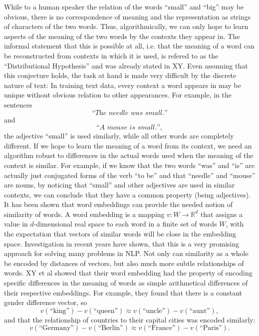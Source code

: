 \documentclass{amsart}
\theoremstyle{plain}
\theoremstyle{definition}
\newcommand{\R}{\mathbb{R}}
\begin{document}
While to a human speaker the relation of the words ``small'' and ``big'' may be obvious, there is no correspondence of meaning and the representation as strings of characters of the two words.
Thus, algorithmically, we can only hope to learn aspects of the meaning of the two words by the contexts they appear in.
The informal statement that this is possible at all, i.e. that the meaning of a word can be reconstructed from contexts in which it is used, is refered to as the ``Distributional Hypothesis'' and was already stated in XY.
Even assuming that this conjecture holds, the task at hand is made very difficult by the discrete nature of text:
In training text data, every context a word appears in may be unique without obvious relation to other appearances.
For example, in the sentences
\begin{equation*}
  \textit{``The needle was small.''}
\end{equation*}
and
\begin{equation*}
  \textit{``A mouse is small.''},
\end{equation*}
the adjective ``small'' is used similarly, while all other words are completely different.
If we hope to learn the meaning of a word from its context, we need an algorithm robust to differences in the actual words used when the meaning of the context is similar.
For example, if we know that the two words ``was'' and ``is'' are actually just conjugated forms of the verb ``to be'' and that ``needle'' and ``mouse'' are nouns, by noticing that ``small'' and other adjectives are used in similar contexts, we can conclude that they have a common property (being adjectives).
It has been shown that word embeddings can provide the needed notion of similarity of words.
A word embedding is a mapping $v : W \rightarrow \R^d$ that assigns a value in $d$-dimensional real space to each word in a finite set of words $W$, with the expectation that vectors of similar words will be close in the embedding space.
Investigation in recent years have shown, that this is a very promising approach for solving many problems in NLP.
Not only can similarity as a whole be encoded by distances of vectors, but also much more subtle relationships of words.
XY et al showed that their word embedding had the property of encoding specific differences in the meaning of words as simple arithmetical differences of their respective embeddings.
For example, they found that there is a constant gender difference vector, so
\begin{equation*}
  v(\text{``king''}) - v(\text{``queen''}) \approx v(\text{``uncle''}) - v(\text{``aunt''}),
\end{equation*}
and that the relationship of countries to their capital cities was encoded similarly:
\begin{equation*}
  v(\text{``Germany''}) - v(\text{``Berlin''}) \approx v(\text{``France''}) - v(\text{``Paris''}).
\end{equation*}
\end{document}
